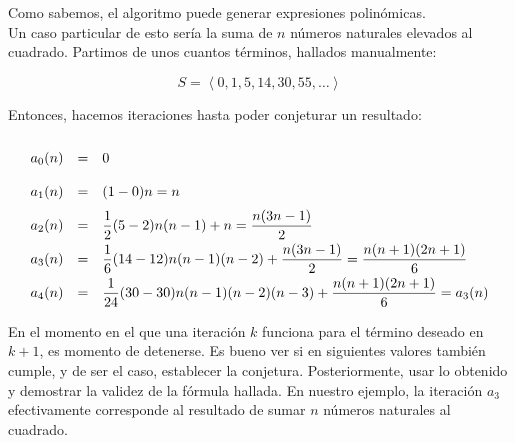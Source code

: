 Como sabemos, el algoritmo puede generar expresiones polinómicas.\\
Un caso particular de esto sería la suma de $n$ números naturales elevados
al cuadrado. Partimos de unos cuantos términos, hallados manualmente:

\[S = \left<0, 1, 5, 14, 30, 55, \dots \right>\]

Entonces, hacemos iteraciones hasta poder conjeturar un resultado:

\[
    \RenewDocumentCommand{\arraystretch}{}{2}
    \begin{matrix*}[l]
        a_0(n) &=& 0\\
        a_1(n) &=& (1-0)n = n\\
        a_2(n) &=& \dfrac{1}{2}(5 - 2)n(n-1) + n = \dfrac{n(3n - 1)}{2}\\
        a_3(n) &=& \dfrac{1}{6}(14 - 12)n(n-1)(n-2) + \dfrac{n(3n - 1)}{2} 
        = \dfrac{n(n+1)(2n+1)}{6}\\
        a_4(n) &=& \dfrac{1}{24}(30 - 30)n(n-1)(n-2)(n-3) + \dfrac{n(n+1)(2n+1)}{6}
        = a_3(n)
    \end{matrix*}
\]

En el momento en el que una iteración $k$ funciona para el término deseado en $k+1$,
es momento de detenerse. Es bueno ver si en siguientes valores también cumple, y de ser
el caso, establecer la conjetura. Posteriormente, usar lo obtenido y demostrar la validez
de la fórmula hallada. En nuestro ejemplo, la iteración $a_3$ efectivamente corresponde
al resultado de sumar $n$ números naturales al cuadrado.
